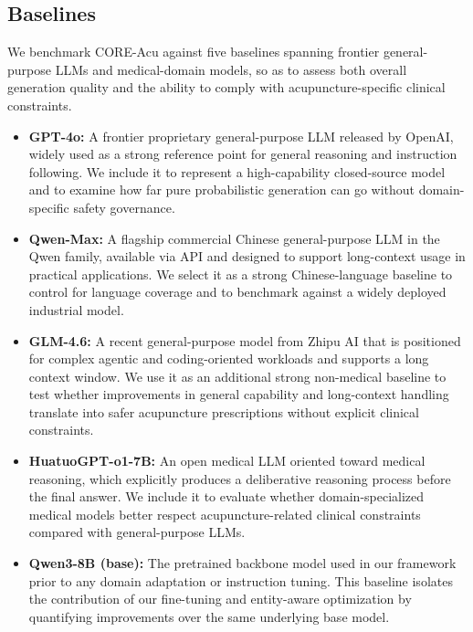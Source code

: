 \documentclass[preprint,5p,times,twocolumn,fleqn]{elsarticle}
\begin{document}
\subsection{Baselines}
We benchmark CORE-Acu against five baselines spanning frontier general-purpose LLMs and medical-domain models, so as to assess both overall generation quality and the ability to comply with acupuncture-specific clinical constraints.
\begin{itemize}
    \item \textbf{GPT-4o:} A frontier proprietary general-purpose LLM released by OpenAI, widely used as a strong reference point for general reasoning and instruction following. 
    We include it to represent a high-capability closed-source model and to examine how far pure probabilistic generation can go without domain-specific safety governance.

    \item \textbf{Qwen-Max:} A flagship commercial Chinese general-purpose LLM in the Qwen family, available via API and designed to support long-context usage in practical applications. 
    We select it as a strong Chinese-language baseline to control for language coverage and to benchmark against a widely deployed industrial model.

    \item \textbf{GLM-4.6:} A recent general-purpose model from Zhipu AI that is positioned for complex agentic and coding-oriented workloads and supports a long context window. 
    We use it as an additional strong non-medical baseline to test whether improvements in general capability and long-context handling translate into safer acupuncture prescriptions without explicit clinical constraints.

    \item \textbf{HuatuoGPT-o1-7B:} An open medical LLM oriented toward medical reasoning, which explicitly produces a deliberative reasoning process before the final answer. 
    We include it to evaluate whether domain-specialized medical models better respect acupuncture-related clinical constraints compared with general-purpose LLMs.

    \item \textbf{Qwen3-8B (base):} The pretrained backbone model used in our framework prior to any domain adaptation or instruction tuning. 
    This baseline isolates the contribution of our fine-tuning and entity-aware optimization by quantifying improvements over the same underlying base model.
\end{itemize}
\end{document}
